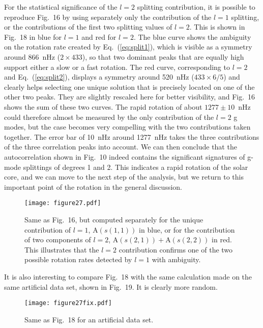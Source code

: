 \documentclass[bibyear]{aa}
\begin{document}
For the statistical significance of the $l=2$ splitting contribution, it is possible to reproduce Fig.~16  by using separately only the contribution of the $l=1$ splitting, or the contributions of the first two splitting values of $l=2$. This is shown in Fig.~18 in blue for $l=1$ and red for $l=2$. The blue curve shows the ambiguity on the rotation rate created by Eq.~(\ref{eq:split1}), which is visible as a symmetry around 866~nHz ($2\times433$), so that two dominant peaks that are equally high support either a slow or a fast rotation. The red curve, corresponding to $l=2$ and Eq.~(\ref{eq:split2}), displays a symmetry around 520~nHz ($433\times 6/5$) and clearly helps selecting one unique solution
that is precisely located on one of the other two peaks. They are slightly rescaled here for better visibility, and Fig.~16 shows the sum of these two curves. The rapid rotation of about $1277\pm10$~nHz could therefore almost be measured by the only contribution of the $l=2$ g modes, but the case becomes very compelling with the two contributions taken together. The error bar of 10~nHz around 1277~nHz takes the three contributions of the three correlation peaks into account. 
We can then conclude that the autocorrelation shown in Fig.~10 indeed contains the significant signatures of g-mode splittings of degrees 1 and 2. This indicates a rapid rotation of the solar
core, and we  can move  to the next step of the analysis, but we return to this important point of the rotation in the general discussion.

\begin{figure}
\centering
\texttt{[image: figure27.pdf]}
\caption{Same as Fig.~16, but computed separately for the unique contribution of $l=1$, $\mathrm{A}(s(1,1))$ in blue, or for the contribution of two components of $l=2$, $\mathrm{A}(s(2,1))+ \mathrm{A}(s(2,2))$ in red. This illustrates that the $l=2$ contribution confirms one of the two possible rotation rates detected by $l=1$ with ambiguity. }
\label{fig:Scor_1_2}
\end{figure} 

It is also interesting to compare Fig.~18 with the same calculation made on the same artificial data set, shown in Fig.~19. It is clearly more random.

\begin{figure}
\centering
\texttt{[image: figure27fix.pdf]}
\caption{Same as Fig.~18 for an artificial data set. }
\label{fig:Scor_1_2_simu}
\end{figure} 
\end{document}
